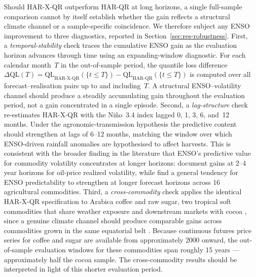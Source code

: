 Should HAR-X-QR outperform HAR-QR at long horizons, a single full-sample
comparison cannot by itself establish whether the gain reflects a structural
climate channel or a sample-specific coincidence. We therefore subject any
ENSO improvement to three diagnostics, reported in
Section~\ref{sec:res-robustness}. First, a \emph{temporal-stability} check
traces the cumulative ENSO gain as the evaluation horizon advances through
time using an expanding-window diagnostic. For each calendar month~$T$ in
the out-of-sample period, the quantile loss difference
$\Delta\text{QL}(T) = \text{QL}_{\text{HAR-X-QR}}(\{t \leq T\}) -
\text{QL}_{\text{HAR-QR}}(\{t \leq T\})$ is computed over all
forecast--realisation pairs up to and including~$T$. A structural ENSO--volatility channel should produce a
steadily accumulating gain throughout the evaluation period, not a gain
concentrated in a single episode. Second, a \emph{lag-structure}
check re-estimates HAR-X-QR with the Ni\~no~3.4 index lagged 0, 1, 3, 6, and~12
months. Under the agronomic-transmission hypothesis the predictive content should
strengthen at lags of 6--12 months, matching the window over which
ENSO-driven rainfall anomalies are hypothesised to affect harvests. This
is consistent with the broader finding in the literature that ENSO's
predictive value for commodity volatility concentrates at longer horizons:
\textcite{bouriNinoForecastabilityOilprice2021} document gains at 2--4 year
horizons for oil-price realized volatility, while
\textcite{bonatoNinoNinaForecastability2023} find a general tendency for
ENSO predictability to strengthen at longer forecast horizons across 16
agricultural commodities. Third, a \emph{cross-commodity} check applies
the identical HAR-X-QR specification to Arabica coffee and raw sugar, two
tropical soft commodities that share weather exposure and downstream markets
with cocoa \parencite{geVolatilityMugCup2025}, since a genuine climate
channel should produce comparable gains across commodities grown in the same
equatorial belt
\parencite{ubilavaRoleNinoSouthern2018, bonatoNinoNinaForecastability2023}.
Because continuous futures price series for coffee and sugar are available
from approximately 2000 onward, the out-of-sample evaluation windows for these
commodities span roughly 15 years --- approximately half the cocoa sample.
The cross-commodity results should be interpreted in light of this shorter
evaluation period.
